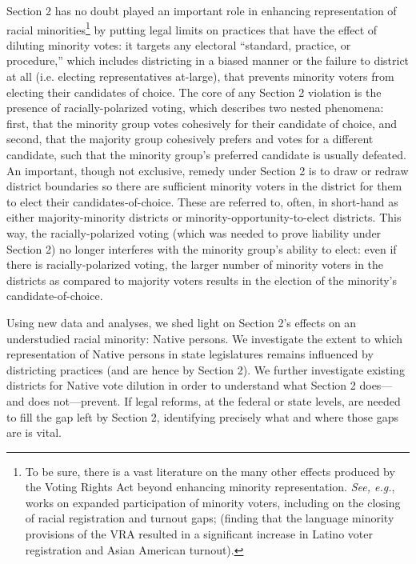 \documentclass[12pt]{article}
\begin{document}
Section 2 has no doubt played an important role in enhancing representation of racial minorities\footnote{To be sure, there is a vast literature on the many other effects produced by the Voting Rights Act beyond enhancing minority representation. \textit{See, e.g.}, works on expanded participation of minority voters, including on the closing of racial registration and turnout gaps; \cite{fraga2016examining} (finding that the language minority provisions of the VRA resulted in a significant increase in Latino voter registration and Asian American turnout).} by putting legal limits on practices that have the effect of diluting minority votes: it targets any electoral ``standard, practice, or procedure,'' which includes districting in a biased manner or the failure to district at all (i.e. electing representatives at-large), that prevents minority voters from electing their candidates of choice. The core of any Section 2 violation is the presence of racially-polarized voting, which describes two nested phenomena: first, that the minority group votes cohesively for their candidate of choice, and second, that the majority group cohesively prefers and votes for a different candidate, such that the minority group's preferred candidate is usually defeated. An important, though not exclusive, remedy under Section 2 is to draw or redraw district boundaries so there are sufficient minority voters in the district for them to elect their candidates-of-choice. These are referred to, often, in short-hand as either majority-minority districts or minority-opportunity-to-elect districts. This way, the racially-polarized voting (which was needed to prove liability under Section 2) no longer interferes with the minority group's ability to elect: even if there is racially-polarized voting, the larger number of minority voters in the districts as compared to majority voters results in the election of the minority's candidate-of-choice.

Using new data and analyses, we shed light on Section 2's effects on an understudied racial minority: Native persons.  We investigate the extent to which representation of Native persons in state legislatures remains influenced by districting practices (and are hence by Section 2). We further investigate existing districts for Native vote dilution in order to understand what Section 2 does---and does not---prevent. If legal reforms, at the federal or state levels, are needed to fill the gap left by Section 2, identifying precisely what and where those gaps are is vital.
\end{document}
